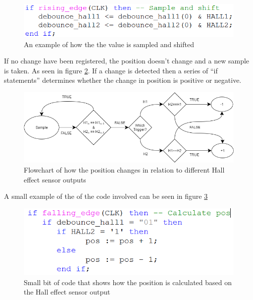 \begin{figure}[h!]
\centering
\includegraphics[scale=0.5]{Billeder/FPGA/Shift_code_example.png}
\caption{ An example of how the the value is sampled and shifted }
\label{fig:Shift code pos}
\end{figure}


If no change have been registered, the position doesn't change and a new sample is taken. As seen in figure \ref{fig:Pos_change_flowchart}. If a change is detected then a series of “if statements” determines whether the change in position is positive or negative.

\begin{figure}[h!]
\centering
\includegraphics[scale=0.5]{Billeder/FPGA/Pos_change_flowchart.png}
\caption{ Flowchart of how the position changes in relation to different Hall effect sensor outputs }
\label{fig:Pos_change_flowchart}
\end{figure}

A small example of the of the code involved can be seen in figure \ref{fig:Pos_change_code_example}

\begin{figure}[h!]
\centering
\includegraphics[scale=0.5]{Billeder/FPGA/Calculate_pos_code_example.png}
\caption{ Small bit of code that shows how the position is calculated based on the Hall effect sensor output }
\label{fig:Pos_change_code_example}
\end{figure}

